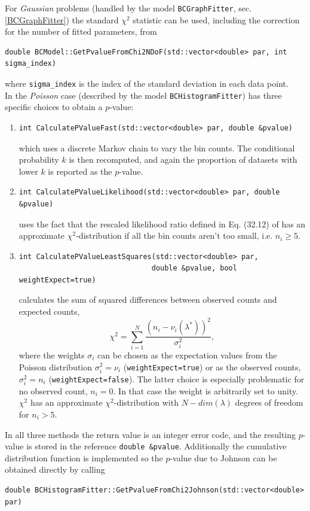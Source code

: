 \documentclass[11pt, a4paper]{article}
\begin{document}
\noindent 
For \textit{Gaussian} problems (handled by the model
\verb|BCGraphFitter|, sec. \ref{BCGraphFitter}) the standard $\chi^2$
statistic can be used, including the correction for the number of
fitted parameters, from
%
\begin{verbatim}
double BCModel::GetPvalueFromChi2NDoF(std::vector<double> par, int sigma_index)
\end{verbatim}
%
where \verb|sigma_index| is the index of the standard deviation in
each data point. \\

\noindent
In the \textit{Poisson} case (described by the model \verb|BCHistogramFitter|) has three
specific choices to obtain a $p$-value: 
\begin{enumerate}
 \item 
\begin{verbatim}
int CalculatePValueFast(std::vector<double> par, double &pvalue)
\end{verbatim}
which uses a discrete Markov chain to vary the bin counts. 
The conditional probability $k$ is then recomputed, and
again the proportion of datasets with lower $k$ is
reported as the $p$-value. 
\item
\begin{verbatim}
int CalculatePValueLikelihood(std::vector<double> par, double &pvalue)
\end{verbatim}
uses the fact that the rescaled likelihood ratio defined in
Eq. (32.12) of \cite{PDGstatistics} has an approximate
$\chi^2$-distribution if all the bin counts aren't too small,
i.e. $n_i \ge 5$.

\item
\begin{verbatim}
int CalculatePValueLeastSquares(std::vector<double> par,
                               double &pvalue, bool weightExpect=true)
\end{verbatim}
calculates the sum of squared differences between observed counts and
expected counts, $$\chi^2 = \sum_{i=1}^N \frac{\left(n_i -
\nu_i(\lambda^{*})\right)^2}{\sigma_i^2},$$ where the weights
$\sigma_i$ can be chosen as the expectation values from the Poisson
distribution $\sigma_i^2 = \nu_i$ (\verb|weightExpect=true|) or as the
observed counts, $\sigma_i^2 = n_i$ (\verb|weightExpect=false|).  The
latter choice is especially problematic for no observed count, $n_i
=0$. In that case the weight is arbitrarily set to unity.  $\chi^2$
has an approximate $\chi^2$-distribution with $N-dim(\lambda)$ degrees
of freedom for $n_i>5$.
\end{enumerate}
In all three methods the return value is an integer error code, and
the resulting $p$-value is stored in the reference
\verb|double &pvalue|.  Additionally the cumulative distribution
function is implemented so the $p$-value due to Johnson
\cite{Johnson_pValue} can be obtained directly by calling
\begin{verbatim}
double BCHistogramFitter::GetPvalueFromChi2Johnson(std::vector<double> par)
\end{verbatim}
\end{document}
